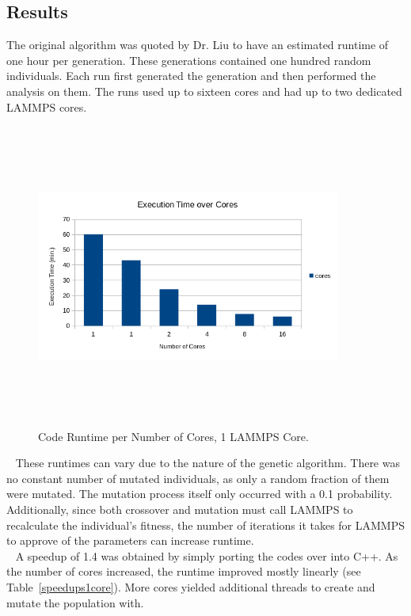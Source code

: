\documentclass[letterpaper, 12pt]{article}
\begin{document}
\begin{flushleft}
\newpage
\section*{Results}
The original algorithm was quoted by Dr. Liu to have an estimated runtime of one hour per generation.  These generations contained one hundred random individuals.  Each run first generated the generation and then performed the analysis on them.  The runs used up to sixteen cores and had up to two dedicated LAMMPS cores.

\begin{figure}[H]
	\centering
	\includegraphics[width=10cm,height=10cm,keepaspectratio]{results.png}
	\caption[Run Times per Core]{Code Runtime per Number of Cores, 1 LAMMPS Core.}
	\label{fig:runtimes1core}
\end{figure}

~\newline
These runtimes can vary due to the nature of the genetic algorithm.  There was no constant number of mutated individuals, as only a random fraction of them were mutated.  The mutation process itself only occurred with a 0.1 probability.  Additionally, since both crossover and mutation must call LAMMPS to recalculate the individual's fitness, the number of iterations it takes for LAMMPS to approve of the parameters can increase runtime. \\

~\newline
A speedup of 1.4 was obtained by simply porting the codes over into C++.  As the number of cores increased, the runtime improved mostly linearly (see Table~\ref{speedups1core}).  More cores yielded additional threads to create and mutate the population with.  \\


\end{flushleft}
\end{document}
